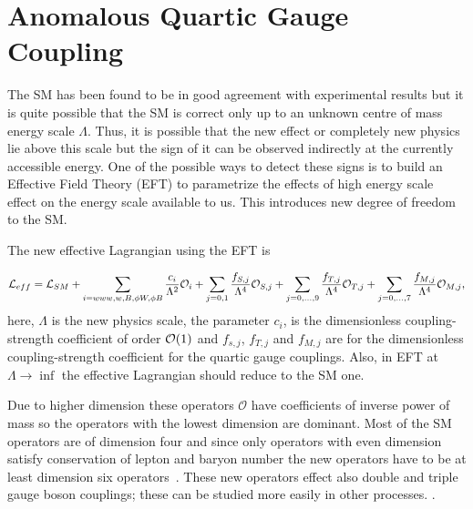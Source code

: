 
\section{Anomalous Quartic Gauge Coupling} %
\label{sec:anomalous_quartic_gauge_coupling}
The SM has been found to be in good agreement with experimental results but it is quite possible that the SM is correct only up to an unknown centre of mass energy scale $\Lambda$.
Thus, it is possible that the new effect or completely new physics lie above this scale but the sign of it can be observed indirectly at the currently accessible energy.
One of the possible ways to detect these signs is to build an Effective Field Theory (EFT) to parametrize the effects of high energy scale effect on the energy scale available to us. This introduces new degree of freedom to the SM.

The new effective Lagrangian using the EFT is

\begin{equation}
    \mathcal{L}_{eff} = \mathcal{L}_{SM} + \sum_{i=www,w,B, \phi W, \phi B} \frac{c_i}{\Lambda^2} {\mathcal{O}}_i + \sum_{j=0,1}\frac{f_{S,j}}{\Lambda^4} \mathcal{O}_{S,j} + \sum_{j=0,...,9}\frac{f_{T,j}}{\Lambda^4} \mathcal{O}_{T,j}  + \sum_{j=0,...,7}\frac{f_{M,j}}{\Lambda^4} \mathcal{O}_{M,j} ,
\end{equation}
here, $\Lambda$ is the new physics scale, the parameter $c_i$, is the dimensionless coupling-strength coefficient of order $\mathcal{O}(1)$ and $f_{s,j}$, $f_{T,j}$ and $f_{M,j}$ are for the dimensionless coupling-strength coefficient for the quartic gauge couplings. Also, in EFT at $\Lambda \rightarrow \inf$ the effective Lagrangian should reduce to the SM one.

Due to higher dimension these operators $\mathcal{O}$ have coefficients of inverse power of mass so the operators with the lowest dimension are dominant. Most of the SM operators are of dimension four and since only operators with even dimension satisfy conservation of lepton and baryon number the new operators have to be at least dimension six operators~\cite{Degrande2013a}. 
These new operators effect also double and triple gauge boson couplings; these can be studied more easily in other processes. .


